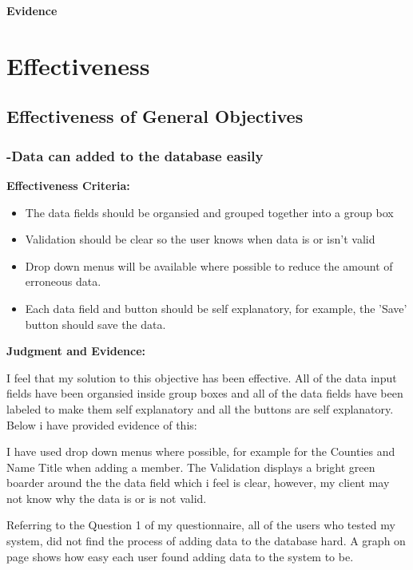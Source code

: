 \textbf{Evidence} \newline




\section{Effectiveness}

\subsection{Effectiveness of General Objectives}







\subsubsection{-Data can added to the database easily}

\textbf{Effectiveness Criteria:}\newline
\begin{itemize}
	\item{The data fields should be organsied and grouped together into a group box}
	\item{Validation should be clear so the user knows when data is or isn't valid}
	\item{Drop down menus will be available where possible to reduce the amount of erroneous data.}
	\item{Each data field and button should be self explanatory, for example, the 'Save' button should save the data.}
\end{itemize}
\textbf{Judgment and Evidence:} \newline

I feel that my solution to this objective has been effective. All of the data input fields have been organsied inside group boxes and all of the data fields have been labeled to make them self explanatory and all the buttons are self explanatory. Below i have provided evidence of this:

I have used drop down menus where possible, for example for the Counties and Name Title when adding a member. The Validation displays a bright green boarder around the the data field which i feel is clear, however, my client may not know why the data is or is not valid.

Referring to the Question 1 of my questionnaire, all of the users who tested my system, did not find the process of adding data to the database hard. A graph on page \pageref{} shows how easy each user found adding data to the system to be.







